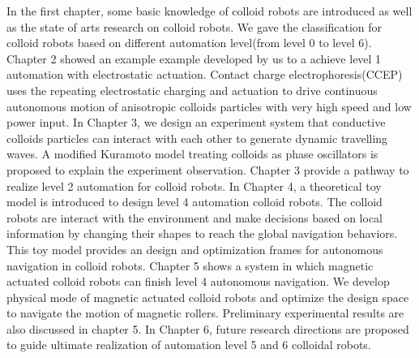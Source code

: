 In the first chapter, some basic knowledge of colloid robots are introduced as well as the state of arts research on colloid robots. We gave the  classification for colloid robots based on different automation level(from level 0 to level 6). Chapter 2 showed  an example example developed by us to a achieve level 1 automation with electrostatic actuation. Contact charge electrophoresis(CCEP) uses the repeating electrostatic charging and actuation to drive   
continuous autonomous motion of anisotropic colloids particles with very high speed and low power input. In Chapter 3, we  design an experiment system that conductive  colloids particles can interact with each other to generate dynamic travelling waves. A modified Kuramoto model treating colloids as phase oscillators is proposed to explain the experiment observation. Chapter 3 provide a pathway to realize level 2 automation for colloid robots. In Chapter 4, a theoretical toy model is introduced to design level 4 automation colloid robots. The colloid robots are interact with the environment and make decisions based on local information by changing their shapes to reach the global navigation behaviors. This toy model provides an design and optimization frames for autonomous navigation in colloid robots. Chapter 5  shows a system in which  magnetic actuated colloid robots can  finish level 4 autonomous navigation. We develop physical mode of     magnetic actuated colloid robots and optimize the design space to navigate the motion of magnetic rollers.  Preliminary experimental results are also discussed in chapter 5. In Chapter 6, future research directions  are proposed  to guide  ultimate realization of  automation level 5 and 6 colloidal robots. 

